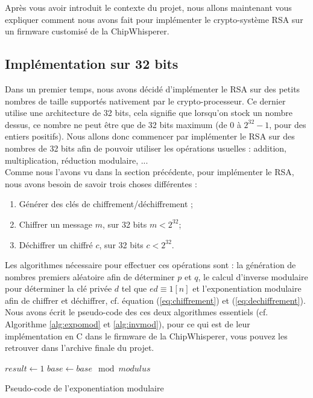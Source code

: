 Après vous avoir introduit le contexte du projet, nous allons maintenant vous expliquer comment nous avons fait pour implémenter le crypto-système RSA sur un firmware customisé de la ChipWhisperer.

\subsection{Implémentation sur 32 bits}
Dans un premier temps, nous avons décidé d'implémenter le RSA sur des petits nombres de taille supportés nativement par le crypto-processeur. Ce dernier utilise une architecture de 32 bits, cela signifie que lorsqu'on stock un nombre dessus, ce nombre ne peut être que de 32 bits maximum (de $0$ à $2^{32} - 1$, pour des entiers positifs). Nous allons donc commencer par implémenter le RSA sur des nombres de 32 bits afin de pouvoir utiliser les opérations usuelles : addition, multiplication, réduction modulaire, ...\\

Comme nous l'avons vu dans la section précédente, pour implémenter le RSA, nous avons besoin de savoir trois choses différentes :
\begin{enumerate}
	\item Générer des clés de chiffrement/déchiffrement ;
	\item Chiffrer un message $m$, sur 32 bits $m < 2^{32}$;
	\item Déchiffrer un chiffré $c$, sur 32 bits $c < 2^{32}$.
\end{enumerate}
\medskip
Les algorithmes nécessaire pour effectuer ces opérations sont : la génération de nombres premiers aléatoire afin de déterminer $p$ et $q$, le calcul d'inverse modulaire pour déterminer la clé privée $d$ tel que $ed \equiv 1 [n]$ et l'exponentiation modulaire afin de chiffrer et déchiffrer, cf. équation (\ref{eq:chiffrement}) et (\ref{eq:dechiffrement}).\\

Nous avons écrit le pseudo-code des ces deux algorithmes essentiels (cf. Algorithme \ref{alg:expomod} et \ref{alg:invmod}), pour ce qui est de leur implémentation en C dans le firmware de la ChipWhisperer, vous pouvez les retrouver dans l'archive finale du projet.

\medskip
\begin{algorithm}[p]
\SetAlgoLined
{}
$result \leftarrow 1$\;
$base \leftarrow base \mod modulus$\;
\;
\caption{Pseudo-code de l'exponentiation modulaire}
\label{alg:expomod}
\end{algorithm}
\medskip

